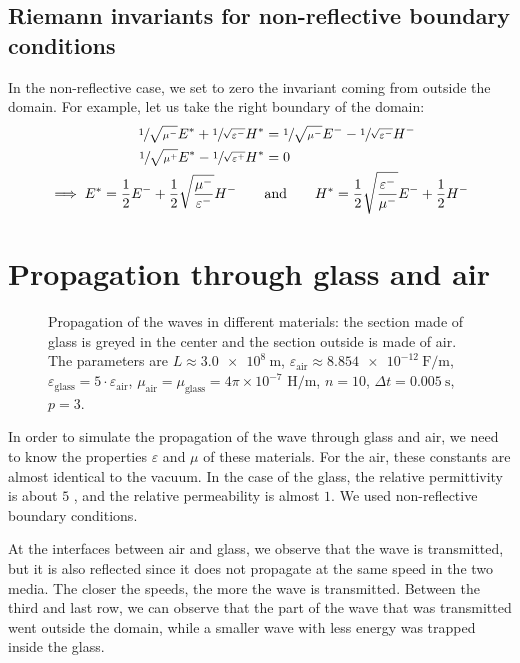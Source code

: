 \documentclass[11 pt]{article}
\begin{document}
\subsection{Riemann invariants for non-reflective boundary conditions}
In the non-reflective case, we set to zero the invariant coming from outside the domain. For example, let us take the right boundary of the domain:
\begin{align*}
    \sfrac{1}{\sqrt{\mu^{-}}} E^* + \sfrac{1}{\sqrt{\varepsilon^{-}}} H^* &= \sfrac{1}{\sqrt{\mu^{-}}} E^- - \sfrac{1}{\sqrt{\varepsilon^{-}}} H^-\\
    \sfrac{1}{\sqrt{\mu^{+}}} E^* - \sfrac{1}{\sqrt{\varepsilon^{+}}} H^* &= 0\\
    \implies E^* = \frac{1}{2}E^- + \frac{1}{2}\sqrt{\frac{\mu^-}{\varepsilon^-}} H^- \qquad &\text{and} \qquad H^* = \frac{1}{2} \sqrt{\frac{\varepsilon^-}{\mu^-}} E^- + \frac{1}{2}H^-
\end{align*}


\section{Propagation through glass and air}
\begin{figure}[H]
    \centering
    
    \caption{Propagation of the waves in different materials: the section made of glass is greyed in the center and the section outside is made of air. The parameters are $L \approx \SI{3.0e+8}{\m}$, $\varepsilon_{\text{air}} \approx \SI[per-mode=symbol]{8.854e-12}{\farad\per\m}$, $\varepsilon_{\text{glass}}=5 \cdot \varepsilon_{\text{air}}$, $\mu_{\text{air}} = \mu_{\text{glass}} = 4 \pi \times 10^{-7}\text{ H/m}$, $n=10$, $\Delta t= \SI{0.005}{\s}$, $p=3$.}
    \label{fig:glass}
\end{figure}
In order to simulate the propagation of the wave through glass and air, we need to know the properties $\varepsilon$ and $\mu$ of these materials. For the air, these constants are almost identical to the vacuum. In the case of the glass, the relative permittivity is about $5$ \cite{wiki}, and the relative permeability is almost $1$. We used non-reflective boundary conditions.

At the interfaces between air and glass, we observe that the wave is transmitted, but it is also reflected since it does not propagate at the same speed in the two media. The closer the speeds, the more the wave is transmitted. Between the third and last row, we can observe that the part of the wave that was transmitted went outside the domain, while a smaller wave with less energy was trapped inside the glass.
\end{document}

